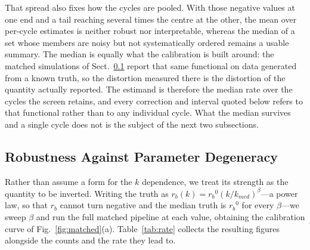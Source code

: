 \documentclass[runningheads]{llncs}
\newcommand{\rb}{\ensuremath{r_{b}}}
\begin{document}
That spread also fixes how the cycles are pooled. With those negative
values at one end and a tail reaching several times the centre at the
other, the mean over per-cycle estimates is neither robust nor
interpretable, whereas the median of a set whose members are noisy but
not systematically ordered remains a usable summary. The median is
equally what the calibration is built around: the matched simulations
of Sect.~\ref{sec:degen} report that same functional on data generated
from a known truth, so the distortion measured there is the distortion
of the quantity actually reported. The estimand is therefore the median
rate over the cycles the screen retains, and every correction and
interval quoted below refers to that functional rather than to any
individual cycle. What the median survives and a single cycle does not
is the subject of the next two subsections.

\subsection{Robustness Against Parameter Degeneracy}
\label{sec:degen}

Rather than assume a form for the $k$ dependence, we treat its strength
as the quantity to be inverted. Writing the truth as
$\rb(k)=\rb^{0}(k/k_{med})^{\beta}$---a power law, so that \rb{} cannot
turn negative and the median truth is $\rb^{0}$ for every
$\beta$---we sweep $\beta$ and run the full matched pipeline at each
value, obtaining the calibration curve of Fig.~\ref{fig:matched}(a).
Table~\ref{tab:rate} collects the resulting figures alongside the
counts and the rate they lead to.
\end{document}
